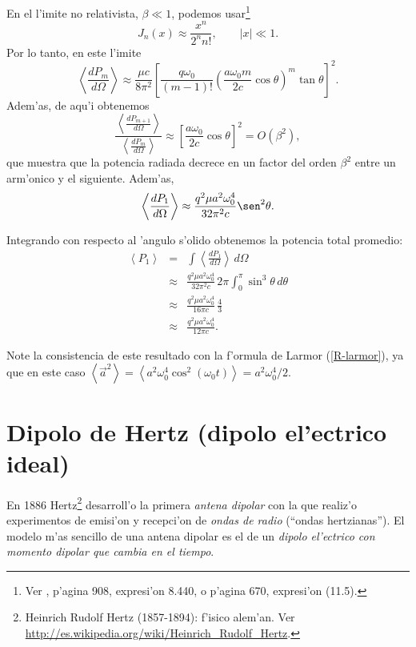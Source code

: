  En el l'imite no relativista, $\beta\ll 1$, podemos usar\footnote{Ver \cite{GR00}, p'agina 908, expresi'on 8.440, o \cite{AW01} p'agina 670, expresi'on (11.5).}
\begin{equation*}
J_{n}(x)\approx \frac{x^n}{2^nn!}, \qquad |x|\ll 1.
\end{equation*}
Por lo tanto, en este l'imite
\begin{equation}
\left\langle \frac{dP_{m}}{d\Omega}\right\rangle
\approx  \frac{\mu c}{8\pi^2}\left[\frac{q\omega_0}{(m-1)!}\left(\frac{a\omega_0m}{2c}\cos\theta\right)^{m}\tan\theta\right]^2.
\end{equation}
Adem'as, de aqu'i obtenemos
\begin{equation}
\frac{\left\langle \frac{dP_{m+1}}{d\Omega}\right\rangle}{\left\langle \frac{dP_{m}}{d\Omega}\right\rangle}\approx \left[\frac{a\omega_0}{2c}\cos\theta\right]^2=O(\beta^2),
\end{equation}
que muestra que la potencia radiada decrece en un factor del orden $\beta^2$ entre un arm'onico y el siguiente. Adem'as,
\begin{equation}
\left\langle \frac{dP_{1}}{d\Omega}\right\rangle
\approx  \frac{q^2\mu a^2\omega_0^4}{32\pi^2 c}\sen^2\theta.
\end{equation}

 Integrando con respecto al 'angulo s'olido obtenemos la potencia total promedio:
\begin{eqnarray}
\left\langle P_{1}\right\rangle&=& \int \left\langle\frac{dP_{1}}{d\Omega}\right\rangle\,d\Omega\\
&\approx &\frac{q^2\mu a^2\omega_0^4}{32\pi^2c}\,2\pi\int_{0}^{\pi
}\sin ^{3}\theta\, d\theta   \\
&\approx &\frac{q^2\mu a^2\omega_0^4}{16\pi c}\,\frac{4}{3}  \\
&\approx &\frac{q^2\mu a^2\omega_0^4}{12\pi c}.
\end{eqnarray}

Note la consistencia de este resultado con la f'ormula de Larmor (\ref{R-larmor}), ya que en este caso $\left\langle\vec{a}^2\right\rangle=\left\langle a^2\omega_0^4\cos^2(\omega_0t)\right\rangle=a^2\omega_0^4/2$.


\section{Dipolo de Hertz (dipolo el'ectrico ideal)}

En 1886 Hertz\footnote{Heinrich Rudolf Hertz (1857-1894): f'isico alem'an. Ver \url{http://es.wikipedia.org/wiki/Heinrich_Rudolf_Hertz}.} desarroll'o la primera \textit{antena dipolar} con la que realiz'o experimentos de emisi'on y recepci'on de \textit{ondas de radio} (``ondas hertzianas''). El modelo m'as sencillo de una antena dipolar es el de un \textit{dipolo el'ectrico con momento dipolar que cambia en el tiempo}.

